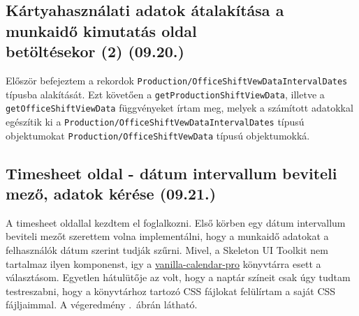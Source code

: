 \documentclass[a4paper]{article}
\newcommand{\inlts}[1]{\texttt{#1}}
\begin{document}
\subsection{Kártyahasználati adatok átalakítása a munkaidő kimutatás oldal\\ betöltésekor (2) (09.20.)}

Először befejeztem a rekordok \inlts{Production/OfficeShiftVewDataIntervalDates}
típusba alakítását. Ezt követően a \inlts{getProductionShiftViewData}, illetve a
\inlts{getOfficeShiftViewData} függvényeket írtam meg, melyek a számított adatokkal egészítik ki a
\inlts{Production/OfficeShiftVewDataIntervalDates} típusú objektumokat
\inlts{Production/OfficeShiftVewData} típusú objektumokká.

\subsection{Timesheet oldal - dátum intervallum beviteli mező, adatok kérése (09.21.)}

A timesheet oldallal kezdtem el foglalkozni. Első körben egy dátum intervallum beviteli mezőt
szerettem volna implementálni, hogy a munkaidő adatokat a felhasználók dátum szerint tudják szűrni.
Mivel, a Skeleton UI Toolkit nem tartalmaz ilyen komponenst, igy a \href{https://vanilla-calendar.pro/}{vanilla-calendar-pro} könyvtárra
esett a választásom. Egyetlen hátulütője az volt, hogy a naptár színeit csak úgy tudtam testreszabni,
hogy a könyvtárhoz tartozó CSS fájlokat felülírtam a saját CSS fájljaimmal. A végeredmény .~ábrán
látható.\\
\end{document}
